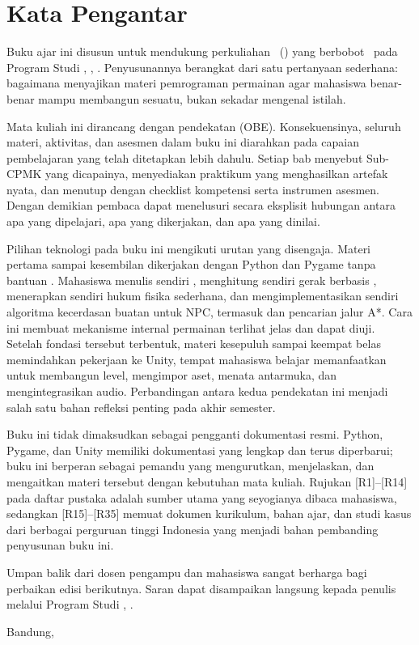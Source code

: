 
\chapter*{Kata Pengantar}
\thispagestyle{plain}

Buku ajar ini disusun untuk mendukung perkuliahan \NamaMK\ (\KodeMK) yang
berbobot \BobotSKS\ pada Program Studi \NamaProdi, \NamaFakultas,
\NamaPT. Penyusunannya berangkat dari satu pertanyaan sederhana: bagaimana
menyajikan materi pemrograman permainan agar mahasiswa benar-benar mampu
membangun sesuatu, bukan sekadar mengenal istilah.

Mata kuliah ini dirancang dengan pendekatan  (OBE). Konsekuensinya, seluruh materi, aktivitas, dan asesmen
dalam buku ini diarahkan pada capaian pembelajaran yang telah ditetapkan
lebih dahulu. Setiap bab menyebut Sub-CPMK yang dicapainya, menyediakan
praktikum yang menghasilkan artefak nyata, dan menutup dengan checklist
kompetensi serta instrumen asesmen. Dengan demikian pembaca dapat menelusuri
secara eksplisit hubungan antara apa yang dipelajari, apa yang dikerjakan,
dan apa yang dinilai.

Pilihan teknologi pada buku ini mengikuti urutan yang disengaja. Materi
pertama sampai kesembilan dikerjakan dengan Python dan Pygame tanpa bantuan
. Mahasiswa menulis sendiri ,
menghitung sendiri gerak berbasis , menerapkan sendiri
hukum fisika sederhana, dan mengimplementasikan sendiri algoritma
kecerdasan buatan untuk NPC, termasuk  dan
pencarian jalur A*. Cara ini membuat mekanisme internal permainan terlihat
jelas dan dapat diuji. Setelah fondasi tersebut terbentuk, materi kesepuluh
sampai keempat belas memindahkan pekerjaan ke Unity, tempat mahasiswa
belajar memanfaatkan  untuk membangun level, mengimpor
aset, menata antarmuka, dan mengintegrasikan audio. Perbandingan antara
kedua pendekatan ini menjadi salah satu bahan refleksi penting pada akhir
semester.

Buku ini tidak dimaksudkan sebagai pengganti dokumentasi resmi. Python,
Pygame, dan Unity memiliki dokumentasi yang lengkap dan terus diperbarui;
buku ini berperan sebagai pemandu yang mengurutkan, menjelaskan, dan
mengaitkan materi tersebut dengan kebutuhan mata kuliah. Rujukan
\mbox{[R1]}--\mbox{[R14]} pada daftar pustaka adalah sumber utama yang
seyogianya dibaca mahasiswa, sedangkan \mbox{[R15]}--\mbox{[R35]} memuat
dokumen kurikulum, bahan ajar, dan studi kasus dari berbagai perguruan
tinggi Indonesia yang menjadi bahan pembanding penyusunan buku ini.

Umpan balik dari dosen pengampu dan mahasiswa sangat berharga bagi
perbaikan edisi berikutnya. Saran dapat disampaikan langsung kepada penulis
melalui Program Studi \NamaProdi, \NamaPT.

\vspace{0.8cm}

\begin{flushright}
Bandung, \BookYear\\
\BookAuthor
\end{flushright}

\clearpage
